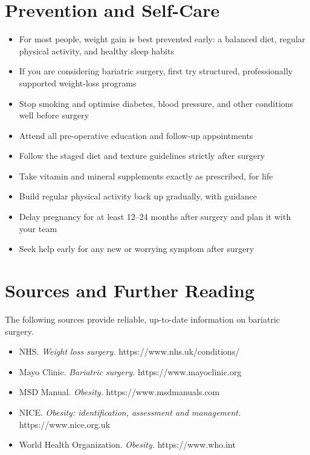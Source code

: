 \section*{Prevention and Self-Care}
\begin{itemize}
    \item For most people, weight gain is best prevented early: a balanced diet, regular physical activity, and healthy sleep habits
    \item If you are considering bariatric surgery, first try structured, professionally supported weight-loss programs
    \item Stop smoking and optimise diabetes, blood pressure, and other conditions well before surgery
    \item Attend all pre-operative education and follow-up appointments
    \item Follow the staged diet and texture guidelines strictly after surgery
    \item Take vitamin and mineral supplements exactly as prescribed, for life
    \item Build regular physical activity back up gradually, with guidance
    \item Delay pregnancy for at least 12--24 months after surgery and plan it with your team
    \item Seek help early for any new or worrying symptom after surgery
\end{itemize}

\section*{Sources and Further Reading}
The following sources provide reliable, up-to-date information on bariatric surgery.
\begin{itemize}
    \item NHS. \textit{Weight loss surgery.} https://www.nhs.uk/conditions/
    \item Mayo Clinic. \textit{Bariatric surgery.} https://www.mayoclinic.org
    \item MSD Manual. \textit{Obesity.} https://www.msdmanuals.com
    \item NICE. \textit{Obesity: identification, assessment and management.} https://www.nice.org.uk
    \item World Health Organization. \textit{Obesity.} https://www.who.int
\end{itemize}
